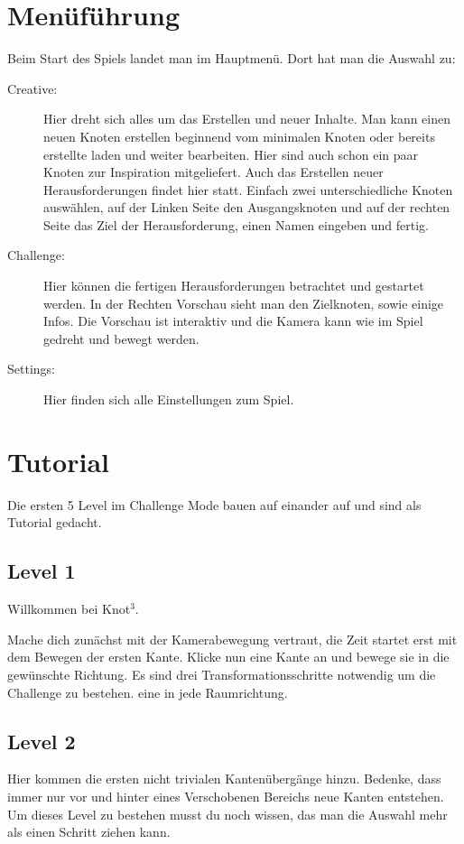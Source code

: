 \documentclass{scrartcl}
\begin{document}
\section*{Menüführung}
Beim Start des Spiels landet man im Hauptmenü. Dort hat man die Auswahl zu:
\begin{description}
\item[Creative:] Hier dreht sich alles um das Erstellen und neuer Inhalte. Man kann einen neuen Knoten erstellen beginnend vom minimalen Knoten oder bereits erstellte laden und weiter bearbeiten.
Hier sind auch schon ein paar Knoten zur Inspiration mitgeliefert. Auch das Erstellen neuer Herausforderungen findet hier statt. Einfach zwei unterschiedliche Knoten auswählen, auf der Linken Seite den Ausgangsknoten und auf der rechten Seite das Ziel der Herausforderung, einen Namen eingeben und fertig.
\item[Challenge:] Hier können die fertigen Herausforderungen betrachtet und gestartet werden. In der Rechten Vorschau sieht man den Zielknoten, sowie einige Infos. Die Vorschau ist interaktiv und die Kamera kann wie im Spiel gedreht und bewegt werden.
\item[Settings:] Hier finden sich alle Einstellungen zum Spiel.
\end{description}

\section*{Tutorial}

Die ersten 5 Level im Challenge Mode bauen auf einander auf und sind als Tutorial gedacht.

\subsection*{Level 1}
Willkommen bei Knot$^3$.

Mache dich zunächst mit der Kamerabewegung vertraut, die Zeit startet erst mit dem Bewegen der ersten Kante. Klicke nun eine Kante an und bewege sie in die gewünschte Richtung. Es sind drei Transformationsschritte notwendig um die Challenge zu bestehen. eine in jede Raumrichtung.

\subsection*{Level 2}
Hier kommen die ersten nicht trivialen Kantenübergänge hinzu. Bedenke, dass immer nur vor und hinter eines Verschobenen Bereichs neue Kanten entstehen. Um dieses Level zu bestehen musst du noch wissen, das man die Auswahl mehr als einen Schritt ziehen kann.
\end{document}
